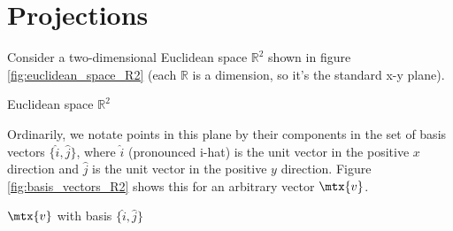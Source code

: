 \section{Projections}

Consider a two-dimensional Euclidean space $\mathbb{R}^2$ shown in figure
\ref{fig:euclidean_space_R2} (each $\mathbb{R}$ is a dimension, so it's the
standard x-y plane).

\begin{bookfigure}

  \caption{Euclidean space $\mathbb{R}^2$}
  \label{fig:euclidean_space_R2}
\end{bookfigure}

Ordinarily, we notate points in this plane by their components in the set of
basis vectors $\{\hat{i}, \hat{j}\}$, where $\hat{i}$ (pronounced i-hat) is the
unit vector in the positive $x$ direction and $\hat{j}$ is the unit vector in
the positive $y$ direction. Figure \ref{fig:basis_vectors_R2} shows this for an
arbitrary vector $\mtx{v}$.

\begin{bookfigure}

  \caption{$\mtx{v}$ with basis $\{\hat{i}, \hat{j}\}$}
  \label{fig:basis_vectors_R2}
\end{bookfigure}


